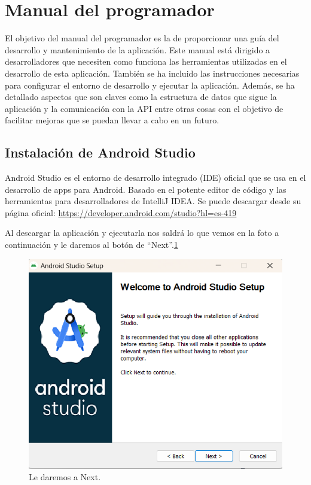 \section{Manual del programador}
El objetivo del manual del programador es la de proporcionar una guía del desarrollo y mantenimiento de la aplicación. Este manual está dirigido a desarrolladores que necesiten como funciona las herramientas utilizadas en el desarrollo de esta aplicación.
También se ha incluido las instrucciones necesarias para configurar el entorno de desarrollo y ejecutar la aplicación.
Además, se ha detallado aspectos que son claves como la estructura de datos que sigue la aplicación y la comunicación con la API entre otras cosas con el objetivo de facilitar mejoras que se puedan llevar a cabo en un futuro.


\subsection{\textbf{Instalación de Android Studio}}
Android Studio es el entorno de desarrollo integrado (IDE) oficial que se usa en el desarrollo de apps para Android. Basado en el potente editor de código y las herramientas para desarrolladores de IntelliJ IDEA.
Se puede descargar desde su página oficial: \url{https://developer.android.com/studio?hl=es-419}



Al descargar la aplicación y ejecutarla nos saldrá lo que vemos en la foto a continuación y le daremos al botón de ``Next''.\ref{C1}
\begin{figure}[H]
    \centering
    \includegraphics[width=0.8\linewidth]{AndroidStudio1.png}
    \caption{Le daremos a Next.}
    \label{C1}
\end{figure}

